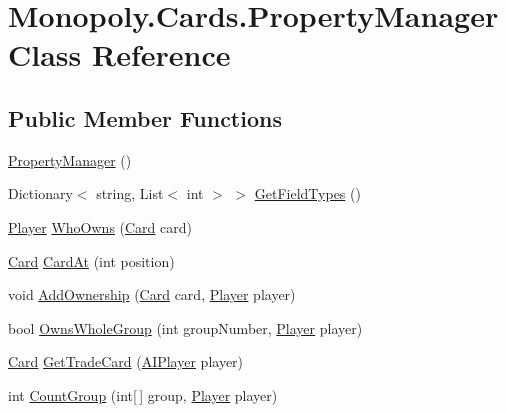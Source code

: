 \hypertarget{class_monopoly_1_1_cards_1_1_property_manager}{}\section{Monopoly.\+Cards.\+Property\+Manager Class Reference}
\label{class_monopoly_1_1_cards_1_1_property_manager}
\subsection*{Public Member Functions}
\begin{DoxyCompactItemize}
\item 
\mbox{\hyperlink{class_monopoly_1_1_cards_1_1_property_manager_af8a34b2ad258ef36018b81066a0b3b15}{Property\+Manager}} ()
\item 
Dictionary$<$ string, List$<$ int $>$ $>$ \mbox{\hyperlink{class_monopoly_1_1_cards_1_1_property_manager_a941bf380058ea9bb90a30377a3d52ee3}{Get\+Field\+Types}} ()
\item 
\mbox{\hyperlink{class_monopoly_1_1_players_1_1_player}{Player}} \mbox{\hyperlink{class_monopoly_1_1_cards_1_1_property_manager_a101662b0cffc7b58e86130c2e53766ce}{Who\+Owns}} (\mbox{\hyperlink{class_monopoly_1_1_cards_1_1_card}{Card}} card)
\item 
\mbox{\hyperlink{class_monopoly_1_1_cards_1_1_card}{Card}} \mbox{\hyperlink{class_monopoly_1_1_cards_1_1_property_manager_aea1ea06f71545f89c0eabd0803c87fb2}{Card\+At}} (int position)
\item 
void \mbox{\hyperlink{class_monopoly_1_1_cards_1_1_property_manager_a370071bfd378ec8b938419c6ccb23e99}{Add\+Ownership}} (\mbox{\hyperlink{class_monopoly_1_1_cards_1_1_card}{Card}} card, \mbox{\hyperlink{class_monopoly_1_1_players_1_1_player}{Player}} player)
\item 
bool \mbox{\hyperlink{class_monopoly_1_1_cards_1_1_property_manager_aca5228c00fd5f7812b754c6c46815d17}{Owns\+Whole\+Group}} (int group\+Number, \mbox{\hyperlink{class_monopoly_1_1_players_1_1_player}{Player}} player)
\item 
\mbox{\hyperlink{class_monopoly_1_1_cards_1_1_card}{Card}} \mbox{\hyperlink{class_monopoly_1_1_cards_1_1_property_manager_a412844ef7c911e8084dae7c3f71d37cc}{Get\+Trade\+Card}} (\mbox{\hyperlink{class_monopoly_1_1_players_1_1_a_i_player}{A\+I\+Player}} player)
\item 
int \mbox{\hyperlink{class_monopoly_1_1_cards_1_1_property_manager_aee4778ccd330d63746183180a20dfc1d}{Count\+Group}} (int\mbox{[}$\,$\mbox{]} group, \mbox{\hyperlink{class_monopoly_1_1_players_1_1_player}{Player}} player)

\end{DoxyCompactItemize}

